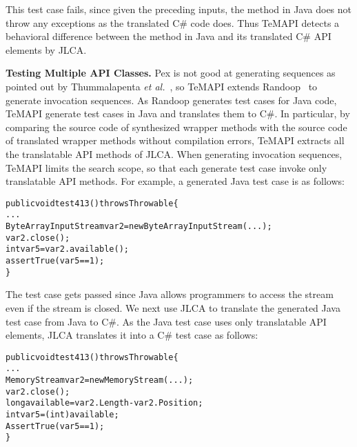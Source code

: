 This test case fails, since given the preceding inputs, the  method in Java does not throw any exceptions as the translated C\# code does. Thus TeMAPI detects a behavioral difference between the  method in Java and its translated C\# API elements by JLCA.

\textbf{Testing Multiple API Classes.} Pex is not good at generating sequences as pointed out by Thummalapenta \emph{et al.}~\cite{thummalapenta09:mseqgen}, so TeMAPI extends Randoop~\cite{pacheco2007feedback} to generate invocation sequences. As Randoop generates test cases for Java code, TeMAPI generate test cases in Java and translates them to C\#. In particular, by comparing the source code of synthesized wrapper methods with the source code of translated wrapper methods without compilation errors, TeMAPI extracts all the translatable API methods of JLCA. When generating invocation sequences, TeMAPI limits the search scope, so that each generate test case invoke only translatable API methods. For example, a generated Java test case is as follows:

\begin{CodeOut}\vspace*{-1ex}
\begin{alltt}
public void test413() throws Throwable\{
  ...
  ByteArrayInputStream var2=new ByteArrayInputStream(...);
  var2.close();
  int var5=var2.available();
  assertTrue(var5 == 1);
\}
\end{alltt}
\end{CodeOut}\vspace*{-2ex}


The test case gets passed since Java allows programmers to access the stream even if the stream is closed. We next use JLCA to translate the generated Java test case from Java to C\#. As the Java test case uses only translatable API elements, JLCA translates it into a C\# test case as follows:

\begin{CodeOut}\vspace*{-1ex}
\begin{alltt}
public void test413() throws Throwable\{
  ...
  MemoryStream var2 = new MemoryStream(...);
  var2.close();
  long available = var2.Length - var2.Position;
  int var5 = (int) available;
  AssertTrue(var5 == 1);
\}
\end{alltt}
\end{CodeOut}\vspace*{-2ex}

